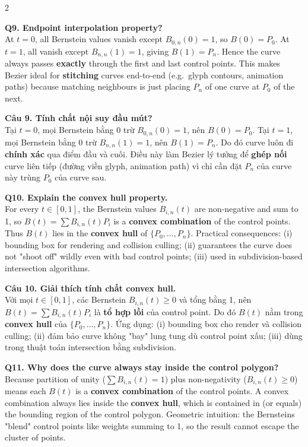 \begin{paracol}{2}
\switchcolumn*

\textbf{Q9. Endpoint interpolation property?}\\
At $t=0$, all Bernstein values vanish except $B_{0,n}(0)=1$, so $B(0)=P_0$. At $t=1$, all vanish except $B_{n,n}(1)=1$, giving $B(1)=P_n$. Hence the curve always passes \textbf{exactly} through the first and last control points. This makes Bezier ideal for \textbf{stitching} curves end-to-end (e.g.\ glyph contours, animation paths) because matching neighbours is just placing $P_n$ of one curve at $P_0$ of the next.

\switchcolumn

\textbf{Câu 9. Tính chất nội suy đầu mút?}\\
Tại $t=0$, mọi Bernstein bằng 0 trừ $B_{0,n}(0)=1$, nên $B(0)=P_0$. Tại $t=1$, mọi Bernstein bằng 0 trừ $B_{n,n}(1)=1$, nên $B(1)=P_n$. Do đó curve luôn đi \textbf{chính xác} qua điểm đầu và cuối. Điều này làm Bezier lý tưởng để \textbf{ghép nối} curve liên tiếp (đường viền glyph, animation path) vì chỉ cần đặt $P_n$ của curve này trùng $P_0$ của curve sau.

\switchcolumn*

\textbf{Q10. Explain the convex hull property.}\\
For every $t \in [0,1]$, the Bernstein values $B_{i,n}(t)$ are non-negative and sum to 1, so $B(t)=\sum B_{i,n}(t) P_i$ is a \textbf{convex combination} of the control points. Thus $B(t)$ lies in the \textbf{convex hull} of $\{P_0,\ldots,P_n\}$. Practical consequences: (i) bounding box for rendering and collision culling; (ii) guarantees the curve does not "shoot off" wildly even with bad control points; (iii) used in subdivision-based intersection algorithms.

\switchcolumn

\textbf{Câu 10. Giải thích tính chất convex hull.}\\
Với mọi $t \in [0,1]$, các Bernstein $B_{i,n}(t) \ge 0$ và tổng bằng 1, nên $B(t)=\sum B_{i,n}(t) P_i$ là \textbf{tổ hợp lồi} của control point. Do đó $B(t)$ nằm trong \textbf{convex hull} của $\{P_0,\ldots,P_n\}$. Ứng dụng: (i) bounding box cho render và collision culling; (ii) đảm bảo curve không "bay" lung tung dù control point xấu; (iii) dùng trong thuật toán intersection bằng subdivision.

\switchcolumn*

\textbf{Q11. Why does the curve always stay inside the control polygon?}\\
Because partition of unity ($\sum B_{i,n}(t)=1$) plus non-negativity ($B_{i,n}(t)\ge 0$) means each $B(t)$ is a \textbf{convex combination} of the control points. A convex combination always lies inside the \textbf{convex hull}, which is contained in (or equals) the bounding region of the control polygon. Geometric intuition: the Bernsteins "blend" control points like weights summing to 1, so the result cannot escape the cluster of points.


\end{paracol}
